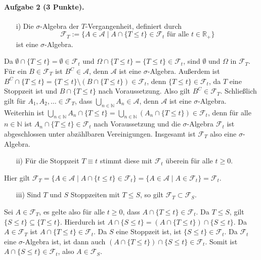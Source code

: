 \documentclass{article}
\begin{document}
\paragraph{Aufgabe 2 \textnormal{(3 Punkte)}.}
\begin{itemize}
\item [i)] Die $\sigma$-Algebra der $T$-Vergangenheit, definiert durch
  \[
    \mathscr{F}_T:=\bigl\{A\in\mathscr{A}\mid A\cap\{T\leq t\}\in\mathscr{F}_t\text{ für alle }t\in\mathbb{R}_+\bigr\}
  \]
  ist eine $\sigma$-Algebra.
\end{itemize}
Da $\emptyset\cap\{T\leq t\}=\emptyset\in\mathscr{F}_t$ und $\Omega\cap\{T\leq t\}=\{T\leq t\}\in\mathscr{F}_t$, sind $\emptyset$ und $\Omega$ in $\mathscr{F}_T$.
Für ein $B\in\mathscr{F}_T$ ist $B^C\in\mathscr{A}$, denn $\mathscr{A}$ ist eine $\sigma$-Algebra.
Außerdem ist $B^C\cap\{T\leq t\}=\{T\leq t\}\setminus(B\cap\{T\leq t\})\in\mathscr{F}_t$, denn $\{T\leq t\}\in\mathscr{F}_t$, da $T$ eine Stoppzeit ist und $B\cap\{T\leq t\}$ nach Voraussetzung. Also gilt $B^C\in\mathscr{F}_T$.
Schließlich gilt für $A_1,A_2,\dots\in\mathscr{F}_T$, dass $\bigcup_{n\in\mathbb{N}}A_n\in\mathscr{A}$, denn $\mathscr{A}$ ist eine $\sigma$-Algebra.
Weiterhin ist $\bigcup_{n\in\mathbb{N}}A_n\cap\{T\leq t\}=\bigcup_{n\in\mathbb{N}}(A_n\cap\{T\leq t\})\in\mathscr{F}_t$, denn für alle $n\in\mathbb{N}$ ist $A_n\cap\{T\leq t\}\in\mathscr{F}_t$ nach Voraussetzung und die $\sigma$-Algebra $\mathscr{F}_t$ ist abgeschlossen unter abzählbaren Vereinigungen.
Insgesamt ist $\mathscr{F}_T$ also eine $\sigma$-Algebra.
\begin{itemize}
\item [ii)] 
  Für die Stoppzeit $T\equiv t$ stimmt diese mit $\mathscr{F}_t$ überein für alle $t\geq 0$.
\end{itemize}
Hier gilt $\mathscr{F}_T=\bigl\{A\in\mathscr{A}\mid A\cap\{t\leq t\}\in\mathscr{F}_t\bigr\}=\{A\in\mathscr{A}\mid A\in\mathscr{F}_t\}=\mathscr{F}_t$.
\begin{itemize}
\item [iii)] Sind $T$ und $S$ Stoppzeiten mit $T\leq S$, so gilt $\mathscr{F}_T\subset\mathscr{F}_S$.
\end{itemize}

Sei $A\in\mathscr{F}_T$, es gelte also für alle $t\geq0$, dass $A\cap\{T\leq t\}\in\mathscr{F}_t$.
Da $T\leq S$, gilt $\{S\leq t\}\subseteq\{T\leq t\}$.
Hierdurch ist $A\cap\{S\leq t\}=(A\cap\{T\leq t\})\cap\{S\leq t\}$.
Da $A\in \mathscr{F}_T$ ist $A\cap\{T\leq t\}\in\mathscr{F}_t$.
Da $S$ eine Stoppzeit ist, ist $\{S\leq t\}\in\mathscr{F}_t$.
Da $\mathscr{F}_t$ eine $\sigma$-Algebra ist, ist dann auch $(A\cap\{T\leq t\})\cap\{S\leq t\}\in\mathscr{F}_t$.
Somit ist $A\cap\{S\leq t\}\in\mathscr{F}_t$, also $A\in\mathscr{F}_S$.

\end{document}
